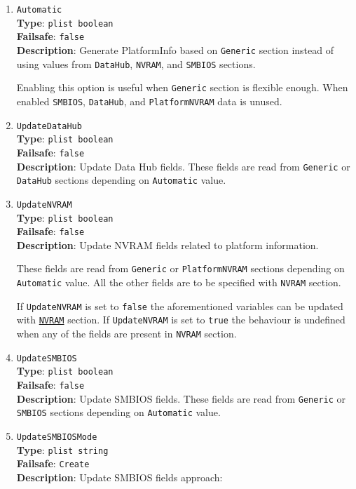 \documentclass[]{article}
\begin{document}
\begin{enumerate}
\item
  \texttt{Automatic}\\
  \textbf{Type}: \texttt{plist\ boolean}\\
  \textbf{Failsafe}: \texttt{false}\\
  \textbf{Description}: Generate PlatformInfo based on \texttt{Generic}
  section instead of using values from \texttt{DataHub}, \texttt{NVRAM},
  and \texttt{SMBIOS} sections.

  Enabling this option is useful when \texttt{Generic} section is flexible
  enough. When enabled \texttt{SMBIOS}, \texttt{DataHub}, and
  \texttt{PlatformNVRAM} data is unused.
\item
  \texttt{UpdateDataHub}\\
  \textbf{Type}: \texttt{plist\ boolean}\\
  \textbf{Failsafe}: \texttt{false}\\
  \textbf{Description}: Update Data Hub fields. These fields are read
  from \texttt{Generic} or \texttt{DataHub} sections depending on
  \texttt{Automatic} value.
\item
  \texttt{UpdateNVRAM}\\
  \textbf{Type}: \texttt{plist\ boolean}\\
  \textbf{Failsafe}: \texttt{false}\\
  \textbf{Description}: Update NVRAM fields related to platform information.

  These fields are read from \texttt{Generic} or \texttt{PlatformNVRAM} sections
  depending on \texttt{Automatic} value. All the other fields are
  to be specified with \texttt{NVRAM} section.

  If \texttt{UpdateNVRAM} is set to \texttt{false} the aforementioned
  variables can be updated with \hyperref[nvram]{\texttt{NVRAM}}
  section. If \texttt{UpdateNVRAM} is set to \texttt{true} the behaviour is
  undefined when any of the fields are present in \texttt{NVRAM} section.
\item
  \texttt{UpdateSMBIOS}\\
  \textbf{Type}: \texttt{plist\ boolean}\\
  \textbf{Failsafe}: \texttt{false}\\
  \textbf{Description}: Update SMBIOS fields. These fields are read from
  \texttt{Generic} or \texttt{SMBIOS} sections depending on
  \texttt{Automatic} value.
\item
  \texttt{UpdateSMBIOSMode}\\
  \textbf{Type}: \texttt{plist\ string}\\
  \textbf{Failsafe}: \texttt{Create}\\
  \textbf{Description}: Update SMBIOS fields approach:


\end{enumerate}
\end{document}
